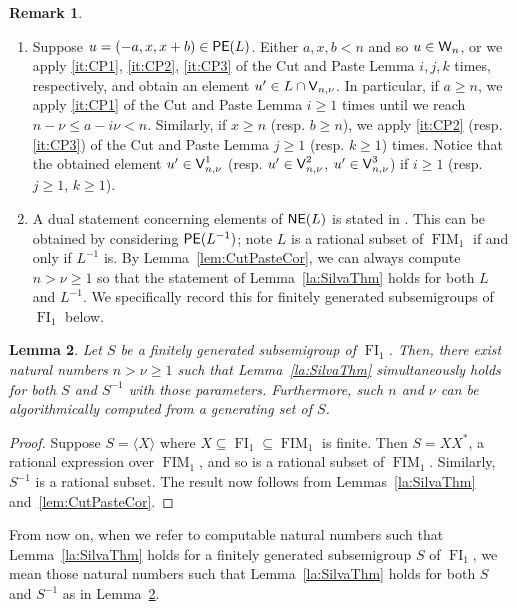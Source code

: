 \documentclass[reqno]{amsart}
\theoremstyle{plain}
\newtheorem{lem}{Lemma}[section]
\theoremstyle{definition}
\newtheorem{rmk}[lem]{Remark}
\DeclareMathOperator{\FI}{FI}
\DeclareMathOperator{\FIM}{FIM}
\DeclareMathOperator{\PE}{\textup{\textsf{PE}}}
\DeclareMathOperator{\NE}{\textup{\textsf{NE}}}
\DeclareMathOperator{\W}{\textup{\textsf{W}}}
\DeclareMathOperator{\V}{\textup{\textsf{V}}}
\newenvironment{rmkenumerate}{\begin{enumerate}[align=left, leftmargin = 0mm, listparindent=0mm, labelwidth=2mm, itemindent=!, itemsep=1.5mm, labelsep=3mm, label=\textup{(\arabic*)}]
}{\end{enumerate}}
\numberwithin{equation}{section}
\begin{document}
\begin{rmk}
\label{rmk:SilvaThm}
\begin{rmkenumerate}
    \item Suppose $u = (-a, x, x+b)\in \PE(L)$. Either $a,x,b<n$ and so $u\in\W_{n}$, or we apply \ref{it:CP1}, \ref{it:CP2}, \ref{it:CP3} of the Cut and Paste Lemma $i,j,k$ times, respectively, and obtain an element $u'\in L\cap \V_{n,\nu}$. 
In particular, if $a\geq n$, we apply \ref{it:CP1} of the Cut and Paste Lemma $i\geq 1$ times
until we reach $n-\nu\leq a-i\nu <n$. Similarly, if $x\geq n$ (resp. $b\geq n$), we apply \ref{it:CP2} (resp. \ref{it:CP3}) of the Cut and Paste Lemma $j\geq 1$ (resp. $k\geq1$) times. Notice that the obtained element $u'\in \V_{n,\nu}^1$ (resp. $u'\in \V_{n,\nu}^2$, $u'\in \V_{n,\nu}^3$) if $i\geq 1$ (resp. $j\geq 1$, $k\geq1$).  
    \item A dual statement concerning elements of $\NE(L)$ is stated in \cite{SilvaRationalSubset}. This can be obtained by considering $\PE(L^{-1})$; note $L$ is a rational subset of $\FIM_1$ if and only if $L^{-1}$ is. By Lemma~\ref{lem:CutPasteCor}, we can always compute $n>\nu\geq 1$ so that the statement of Lemma~\ref{la:SilvaThm} holds for both $L$ and $L^{-1}$. We specifically record this for finitely generated subsemigroups of $\FI_1$ below.
\end{rmkenumerate}
\end{rmk}


\begin{lem}
\label{lem:CutPasteFGSubsem}
Let $S$ be a finitely generated subsemigroup of $\FI_1$. Then, there exist natural numbers $n>\nu\geq 1$ such that Lemma~\ref{la:SilvaThm} simultaneously holds for both $S$ and $S^{-1}$ with those parameters.
Furthermore, such $n$ and $\nu$  
can be algorithmically computed from
a generating set of $S$. 
\end{lem}

\begin{proof}
Suppose $S = \langle X\rangle$ where $X\subseteq\FI_1\subseteq\FIM_1$ is finite. 
Then $S = XX^\ast$, a rational expression over  $\FIM_1$, and so 
is a rational subset of $\FIM_1$. Similarly, $S^{-1}$ is a rational subset. The result now follows from Lemmas~\ref{la:SilvaThm} and~\ref{lem:CutPasteCor}. 
\end{proof}

From now on, when we refer to computable natural numbers such that Lemma~\ref{la:SilvaThm} holds for a finitely generated subsemigroup $S$ of $\FI_1$, we mean those natural numbers such that Lemma~\ref{la:SilvaThm} holds for both $S$ and $S^{-1}$ as in Lemma~\ref{lem:CutPasteFGSubsem}.
\end{document}
